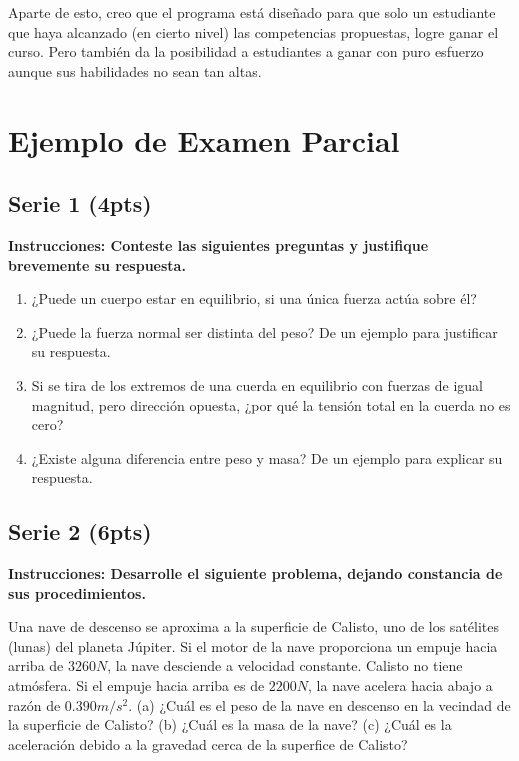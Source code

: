 Aparte de esto, creo que el programa está diseñado para que solo un estudiante que haya alcanzado (en cierto nivel) las competencias propuestas, logre ganar el curso. Pero también da la posibilidad a estudiantes a ganar con puro esfuerzo aunque sus habilidades no sean tan altas.


\section{Ejemplo de Examen Parcial}

\subsection*{Serie 1 (4pts)}
\textbf{Instrucciones: Conteste las siguientes preguntas y justifique brevemente su respuesta.}

\begin{enumerate}
    \item ¿Puede un cuerpo estar en equilibrio, si una única fuerza actúa sobre él?
    \item ¿Puede la fuerza normal ser distinta del peso? De un ejemplo para justificar su respuesta.
    \item Si se tira de los extremos de una cuerda en equilibrio con fuerzas de igual magnitud, pero dirección opuesta, ¿por qué la tensión total en la cuerda no es cero?
    \item ¿Existe alguna diferencia entre peso y masa? De un ejemplo para explicar su respuesta.
\end{enumerate}

\subsection*{Serie 2 (6pts)}
\textbf{Instrucciones: Desarrolle el siguiente problema, dejando constancia de sus procedimientos.}

\vspace{0.4cm}

Una nave de descenso se aproxima a la superficie de Calisto, uno de los satélites (lunas) del planeta Júpiter. Si el motor de la nave proporciona un empuje hacia arriba de $3260N$, la nave desciende a velocidad constante. Calisto no tiene atmósfera. Si el empuje hacia arriba es de $2200N$, la nave acelera hacia abajo a razón de $0.390m/s^2$. (a) ¿Cuál es el peso de la nave en descenso en la vecindad de la superficie de Calisto? (b) ¿Cuál es la masa de la nave? (c) ¿Cuál es la aceleración debido a la gravedad cerca de la superfice de Calisto?